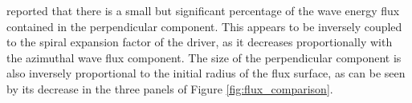 \cite{mumford2015} reported that there is a small but significant percentage of the wave energy flux contained in the perpendicular component.
This appears to be inversely coupled to the spiral expansion factor of the driver, as it decreases proportionally with the azimuthal wave flux component.
The size of the perpendicular component is also inversely proportional to the initial radius of the flux surface, as can be seen by its decrease in the three panels of Figure \ref{fig:flux_comparison}.

%
%
%
%
%
%
%
%
%    
%    
